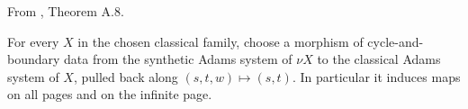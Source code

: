 \begin{definition}
\label{frontier:Literature:a1cdf0a80ba8}
From \cite{BHS}, Theorem A.8.\par

For every $X$ in the chosen classical family, choose a morphism of cycle-and-boundary data from the synthetic Adams system of $\nu X$ to the classical Adams system of $X$, pulled back along $(s,t,w)\mapsto(s,t)$. In particular it induces maps on all pages and on the infinite page.
\end{definition}

